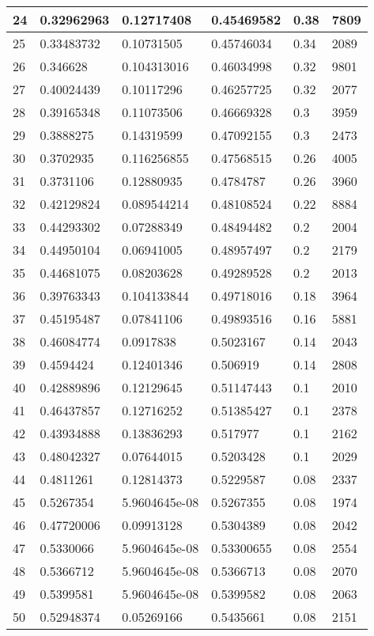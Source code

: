 \begin{longtable}{|l|l|l|l|l|l|}
24 & 0.32962963 & 0.12717408 & 0.45469582 & 0.38 & 7809 \\ \hline 
25 & 0.33483732 & 0.10731505 & 0.45746034 & 0.34 & 2089 \\ \hline 
26 & 0.346628 & 0.104313016 & 0.46034998 & 0.32 & 9801 \\ \hline 
27 & 0.40024439 & 0.10117296 & 0.46257725 & 0.32 & 2077 \\ \hline 
28 & 0.39165348 & 0.11073506 & 0.46669328 & 0.3 & 3959 \\ \hline 
29 & 0.3888275 & 0.14319599 & 0.47092155 & 0.3 & 2473 \\ \hline 
30 & 0.3702935 & 0.116256855 & 0.47568515 & 0.26 & 4005 \\ \hline 
31 & 0.3731106 & 0.12880935 & 0.4784787 & 0.26 & 3960 \\ \hline 
32 & 0.42129824 & 0.089544214 & 0.48108524 & 0.22 & 8884 \\ \hline 
33 & 0.44293302 & 0.07288349 & 0.48494482 & 0.2 & 2004 \\ \hline 
34 & 0.44950104 & 0.06941005 & 0.48957497 & 0.2 & 2179 \\ \hline 
35 & 0.44681075 & 0.08203628 & 0.49289528 & 0.2 & 2013 \\ \hline 
36 & 0.39763343 & 0.104133844 & 0.49718016 & 0.18 & 3964 \\ \hline 
37 & 0.45195487 & 0.07841106 & 0.49893516 & 0.16 & 5881 \\ \hline 
38 & 0.46084774 & 0.0917838 & 0.5023167 & 0.14 & 2043 \\ \hline 
39 & 0.4594424 & 0.12401346 & 0.506919 & 0.14 & 2808 \\ \hline 
40 & 0.42889896 & 0.12129645 & 0.51147443 & 0.1 & 2010 \\ \hline 
41 & 0.46437857 & 0.12716252 & 0.51385427 & 0.1 & 2378 \\ \hline 
42 & 0.43934888 & 0.13836293 & 0.517977 & 0.1 & 2162 \\ \hline 
43 & 0.48042327 & 0.07644015 & 0.5203428 & 0.1 & 2029 \\ \hline 
44 & 0.4811261 & 0.12814373 & 0.5229587 & 0.08 & 2337 \\ \hline 
45 & 0.5267354 & 5.9604645e-08 & 0.5267355 & 0.08 & 1974 \\ \hline 
46 & 0.47720006 & 0.09913128 & 0.5304389 & 0.08 & 2042 \\ \hline 
47 & 0.5330066 & 5.9604645e-08 & 0.53300655 & 0.08 & 2554 \\ \hline 
48 & 0.5366712 & 5.9604645e-08 & 0.5366713 & 0.08 & 2070 \\ \hline 
49 & 0.5399581 & 5.9604645e-08 & 0.5399582 & 0.08 & 2063 \\ \hline 
50 & 0.52948374 & 0.05269166 & 0.5435661 & 0.08 & 2151 \\ \hline 
\end{longtable}